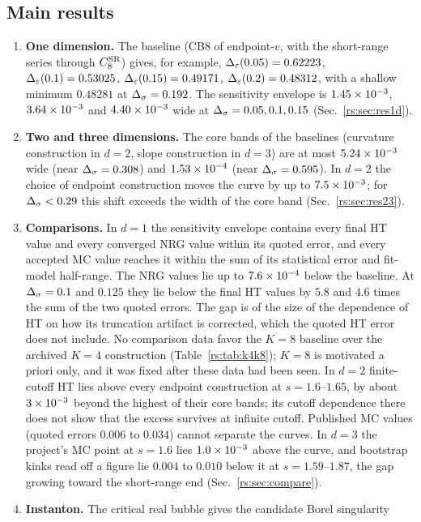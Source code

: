 \subsection{Main results}
\begin{enumerate}
\item \textbf{One dimension.} The baseline (CB8 of endpoint-$v$, with the short-range
series through $C^{\mathrm{SR}}_8$) gives, for example,
$\Delta_\varepsilon(0.05)=0.62223$, $\Delta_\varepsilon(0.1)=0.53025$, $\Delta_\varepsilon(0.15)=0.49171$, $\Delta_\varepsilon(0.2)=0.48312$,
with a shallow minimum $0.48281$ at $\Delta_\sigma=0.192$. The sensitivity envelope is
$1.45\times10^{-3}$, $3.64\times10^{-3}$ and $4.40\times10^{-3}$ wide at
$\Delta_\sigma=0.05,0.1,0.15$ (Sec.~\ref{rs:sec:res1d}).
\item \textbf{Two and three dimensions.} The core bands of the baselines (curvature
construction in $d=2$, slope construction in $d=3$) are at most $5.24\times10^{-3}$ wide (near
$\Delta_\sigma=0.308$) and $1.53\times10^{-4}$ (near $\Delta_\sigma=0.595$). In $d=2$ the choice of endpoint
construction moves the curve by up to $7.5\times10^{-3}$; for $\Delta_\sigma<0.29$ this shift exceeds the
width of the core band (Sec.~\ref{rs:sec:res23}).
\item \textbf{Comparisons.} In $d=1$ the sensitivity envelope contains every final HT value
and every converged NRG value within its quoted error, and every accepted MC value reaches
it within the sum of its statistical error and fit-model half-range. The NRG values lie up
to $7.6\times10^{-4}$ below the baseline. At $\Delta_\sigma=0.1$ and $0.125$ they lie below the final HT
values by $5.8$ and $4.6$ times the sum of the two quoted errors. The gap is of the size of
the dependence of HT on how its truncation artifact is corrected, which the quoted HT error
does not include. No comparison data favor the $K=8$ baseline over the archived $K=4$
construction (Table~\ref{rs:tab:k4k8}); $K=8$ is motivated a priori only, and it was fixed after
these data had been seen. In $d=2$ finite-cutoff HT lies above every endpoint construction at
$s=1.6$--$1.65$, by about $3\times10^{-3}$ beyond the highest of their core bands; its cutoff
dependence there does not show that the excess survives at infinite cutoff. Published MC
values (quoted errors $0.006$ to $0.034$) cannot separate the curves. In $d=3$ the project's
MC point at $s=1.6$ lies $1.0\times10^{-3}$ above the curve, and bootstrap kinks read off a
figure lie $0.004$ to $0.010$ below it at $s=1.59$--$1.87$, the gap growing toward the
short-range end (Sec.~\ref{rs:sec:compare}).
\item \textbf{Instanton.} The critical real bubble gives the candidate Borel singularity

\end{enumerate}
